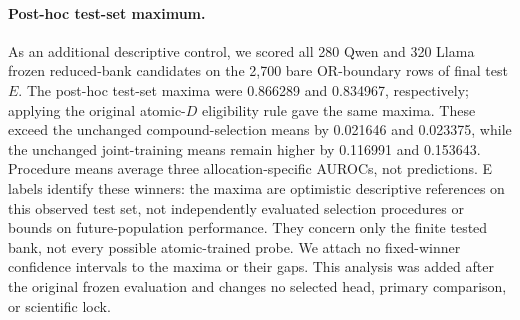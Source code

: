 \paragraph{Post-hoc test-set maximum.}
As an additional descriptive control, we scored all 280 Qwen and 320 Llama
frozen reduced-bank candidates on the 2,700 bare OR-boundary rows of final
test $E$. The post-hoc test-set maxima were 0.866289 and 0.834967, respectively;
applying the original atomic-$D$ eligibility rule gave the same maxima.
These exceed the unchanged compound-selection means by 0.021646 and 0.023375,
while the unchanged joint-training means remain higher by 0.116991 and 0.153643.
Procedure means average three allocation-specific AUROCs, not predictions.
E labels identify these winners: the maxima are optimistic descriptive
references on this observed test set, not independently evaluated selection
procedures or bounds on future-population performance. They concern only the
finite tested bank, not every possible atomic-trained probe. We attach no
fixed-winner confidence intervals to the maxima or their gaps. This analysis
was added after the original frozen evaluation and changes no selected head,
primary comparison, or scientific lock.
